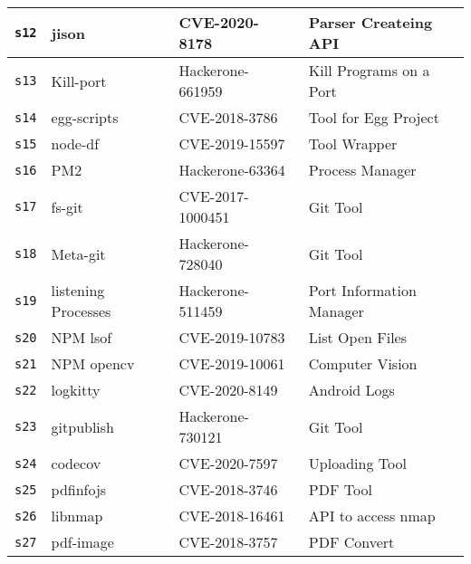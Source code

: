 \begin{table}[t]
{\begin{tabular}{llll}
	{\tt s12}&
	jison~\cite{jison} &
	CVE-2020-8178~\cite{CVE-jison} &
	Parser Createing API
	\\ \midrule

	{\tt s13}&
	Kill-port~\cite{killportprocesses} &
	Hackerone-661959~\cite{CVE-s12} &
	Kill Programs on a Port
	\\ \midrule
	
	{\tt s14}&
	egg-scripts~\cite{eggscripts} &
	CVE-2018-3786~\cite{CVE-s13} &
	Tool for Egg Project
	\\ \midrule
	
	{\tt s15}&
	node-df~\cite{node-df} &
	CVE-2019-15597~\cite{CVE-node-df} &
	Tool Wrapper
	\\ \midrule
	
	{\tt s16}&
	PM2~\cite{PM2} &
	Hackerone-63364~\cite{CVE-s15} &
	Process Manager
	\\ \midrule
	
	{\tt s17}&
	fs-git~\cite{fs-git} &
	CVE-2017-1000451~\cite{CVE-s16} &
	Git Tool
	\\ \midrule
	
	{\tt s18}&
	Meta-git~\cite{meta-git} &
	Hackerone-728040~\cite{CVE-s17}&
	Git Tool
	\\ \midrule
	
	{\tt s19}&
	listening Processes~\cite{listening-processes} &
	Hackerone-511459~\cite{CVE-s18} &
	Port Information Manager
	\\ \midrule
	
	{\tt s20}&
	NPM lsof~\cite{lsof} &
    CVE-2019-10783~\cite{CVE-s19} &
	List Open Files
    \\ \midrule	
		
	{\tt s21}&
	NPM opencv~\cite{opencv} &
	CVE-2019-10061~\cite{CVE-s20} &
	Computer Vision
	\\ \midrule	
		
	{\tt s22}&
	logkitty~\cite{logkitty} &
	CVE-2020-8149~\cite{CVE-logkitty}&
	Android Logs 
	\\ \midrule	
		
	{\tt s23}&
	gitpublish~\cite{git-publish} &
	Hackerone-730121~\cite{CVE-s22}&
	Git Tool
	\\ \midrule
		
	{\tt s24}&
	codecov~\cite{codecov} &
	CVE-2020-7597~\cite{CVE-s23}&
	Uploading Tool
		\\ \midrule
	
	{\tt s25}&
	pdfinfojs~\cite{pdfinfojs} &
	CVE-2018-3746~\cite{CVE-s24} &
	PDF Tool
	\\ \midrule
	
	{\tt s26}&
	libnmap~\cite{libnmap} &
	CVE-2018-16461~\cite{CVE-libnmap}&
	API to access nmap
	\\ \midrule
		
	{\tt s27}&
	pdf-image~\cite{PDF-image} &
	CVE-2018-3757~\cite{CVE-pdfimage} &
	PDF Convert
	\\ 
	\bottomrule
\end{tabular}
}
\label{table:vulnanddescription}
\end{table}